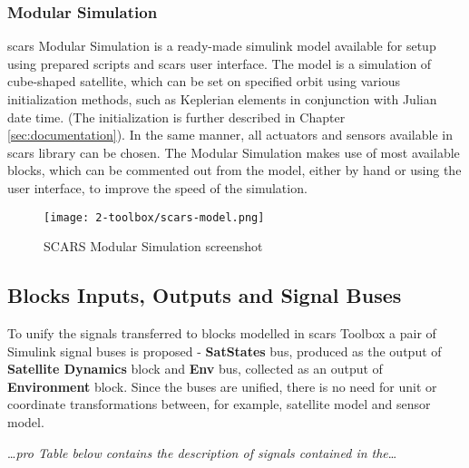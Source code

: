     \subsubsection{Modular Simulation}
        \ac{scars} Modular Simulation is a ready-made simulink model available for setup using prepared scripts and \ac{scars} user interface. The model is a simulation of cube-shaped satellite, which can be set on specified orbit using various initialization methods, such as Keplerian elements in conjunction with Julian date time. (The initialization is further described in Chapter \ref{sec:documentation}). In the same manner, all actuators and sensors available in \ac{scars} library can be chosen. The Modular Simulation makes use of most available blocks, which can be commented out from the model, either by hand or using the user interface, to improve the speed of the simulation.

        \begin{figure}[H]
            \centering
            \texttt{[image: 2-toolbox/scars-model.png]}
            \caption{SCARS Modular Simulation screenshot}
            \label{fig:scars-model}
        \end{figure}


    \subsection{Blocks Inputs, Outputs and Signal Buses}
        To unify the signals transferred to blocks modelled in \ac{scars} Toolbox a pair of Simulink signal buses is proposed - \textbf{SatStates} bus, produced as the output of \textbf{Satellite Dynamics} block and \textbf{Env} bus, collected as an output of \textbf{Environment} block. Since the buses are unified, there is no need for unit or coordinate transformations between, for example, satellite model and sensor model.        
        
        \dots \textit{pro Table below contains the description of signals contained in the}\dots 

